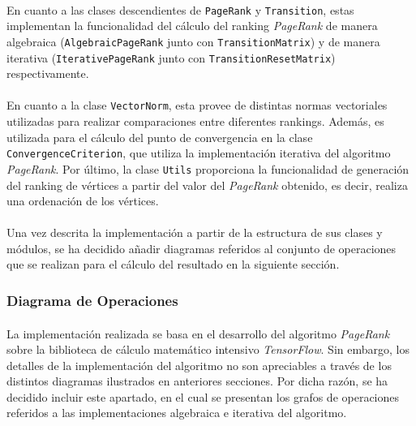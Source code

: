 \documentclass{subfiles}
\begin{document}
          \paragraph{}
          En cuanto a las clases descendientes de \texttt{PageRank} y \texttt{Transition}, estas implementan la funcionalidad del cálculo del ranking \emph{PageRank} de manera algebraica (\texttt{AlgebraicPageRank} junto con \texttt{TransitionMatrix}) y de manera iterativa (\texttt{IterativePageRank} junto con \texttt{TransitionResetMatrix}) respectivamente.

          \paragraph{}
          En cuanto a la clase \texttt{VectorNorm}, esta provee de distintas normas vectoriales utilizadas para realizar comparaciones entre diferentes rankings. Además, es utilizada para el cálculo del punto de convergencia en la clase \texttt{ConvergenceCriterion}, que utiliza la implementación iterativa del algoritmo \emph{PageRank}. Por último, la clase \texttt{Utils} proporciona la funcionalidad de generación del ranking de vértices a partir del valor del \emph{PageRank} obtenido, es decir, realiza una ordenación de los vértices.

          \paragraph{}
          Una vez descrita la implementación a partir de la estructura de sus clases y módulos, se ha decidido añadir diagramas referidos al conjunto de operaciones que se realizan para el cálculo del resultado en la siguiente sección.

        \subsubsection{Diagrama de Operaciones}
        \label{sec:operations_diagram}

          \paragraph{}
          La implementación realizada se basa en el desarrollo del algoritmo \emph{PageRank} sobre la biblioteca de cálculo matemático intensivo \emph{TensorFlow}. Sin embargo, los detalles de la implementación del algoritmo no son apreciables a través de los distintos diagramas ilustrados en anteriores secciones. Por dicha razón, se ha decidido incluir este apartado, en el cual se presentan los grafos de operaciones referidos a las implementaciones algebraica e iterativa del algoritmo.
\end{document}
